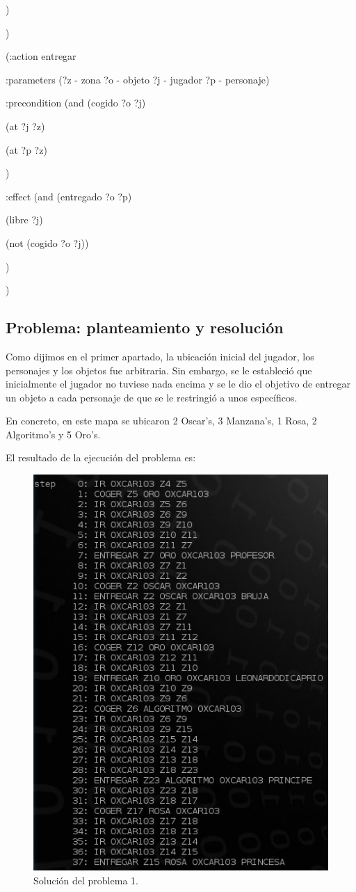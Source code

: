 \documentclass[a4paper, 11pt]{article}
\begin{document}
		              )

		   )

		

		   (:action entregar

		      :parameters (?z - zona ?o - objeto ?j - jugador ?p - personaje)

		      :precondition (and (cogido ?o ?j)

		                         (at ?j ?z)

		                         (at ?p ?z)

		                    )

		      :effect (and (entregado ?o ?p)

		                   (libre ?j)

		                   (not (cogido ?o ?j))

		              )

		   )

		
	
	\subsection{Problema: planteamiento y resolución}
		Como dijimos en el primer apartado, la ubicación inicial del jugador, los personajes y los objetos
		fue arbitraria. Sin embargo, se le estableció que inicialmente el jugador no tuviese nada encima y
		se le dio el objetivo de entregar un objeto a cada personaje de que se le restringió a unos
		específicos.
		
		En concreto, en este mapa se ubicaron 2 Oscar's, 3 Manzana's, 1 Rosa, 2 Algoritmo's y 5 Oro's.
		
		El resultado de la ejecución del problema es:
		\begin{figure}[H]
			\centering
			\includegraphics[width=15cm]{Problema1.jpg}
			\caption{Solución del problema 1.}
			\label{Prob-1}
		\end{figure}
	
\end{document}
